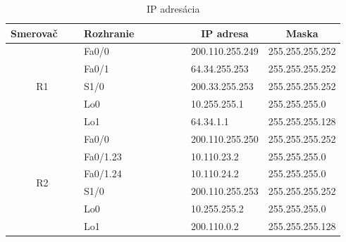 \documentclass[12pt,twoside,a4paper]{report}
\begin{document}
\begin{table}[!htbp]
\centering
\caption{IP adresácia}
\label{tab:ip_adresacia}
\begin{tabular}{|c|l|l|l|}
\hline
\textbf{Smerovač\,\,\,\,\,\,\,\,\,\,}    & \multicolumn{1}{c|}{\textbf{Rozhranie \,\,\,\,\,\,\,\,\,\,\,\, \,\,\,\,\,\,\,\,\,\,\,\,} } & \multicolumn{1}{c|}{\textbf{IP adresa}} & \multicolumn{1}{c|}{\textbf{Maska}} \\ \hline
\multirow{5}{*}{R1}  & Fa0/0                                   & 200.110.255.249                         & 255.255.255.252                     \\ \cline{2-4} 
                     & Fa0/1                                   & 64.34.255.253                           & 255.255.255.252                     \\ \cline{2-4} 
                     & S1/0                                    & 200.33.255.253                          & 255.255.255.252                     \\ \cline{2-4} 
                     & Lo0                                     & 10.255.255.1                            & 255.255.255.0                       \\ \cline{2-4} 
                     & Lo1                                     & 64.34.1.1                               & 255.255.255.128                     \\ \hline
\multirow{6}{*}{R2}  & Fa0/0                                   & 200.110.255.250                         & 255.255.255.252                     \\ \cline{2-4} 
                     & Fa0/1.23                                & 10.110.23.2                             & 255.255.255.0                       \\ \cline{2-4} 
                     & Fa0/1.24                                & 10.110.24.2                             & 255.255.255.0                       \\ \cline{2-4} 
                     & S1/0                                    & 200.110.255.253                         & 255.255.255.252                     \\ \cline{2-4} 
                     & Lo0                                     & 10.255.255.2                            & 255.255.255.0                       \\ \cline{2-4} 
                     & Lo1                                     & 200.110.0.2                             & 255.255.255.128                     \\ \hline

\end{tabular}
\end{table}
\end{document}
